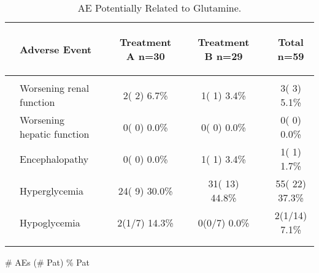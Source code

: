 \documentclass[dvips,10pt]{article}
\begin{document}
\begin{table}[t]
\caption
{ AE Potentially Related to Glutamine. }
\begin{center}
\begin{tabular}{ @{}l@{}
@{}l@{}@{}p{1.5em}@{}@{}c@{}@{}p{1.5em}@{}@{}c@{}@{}p{1.5em}@{}@{}c@{}
}
\hline

& \parbox{6em}{\begin{center}Adverse Event\end{center}} && \parbox{6em}{\begin{center}Treatment A n=30\end{center}} && \parbox{6em}{\begin{center}Treatment B n=29\end{center}} && \parbox{6em}{\begin{center}Total n=59\end{center}} \\

\hline

\\
& Worsening renal function && 2(  2)  6.7\% && 1(  1)  3.4\% && 3(  3)  5.1\% \\
& Worsening hepatic function && 0(  0)  0.0\% && 0(  0)  0.0\% && 0(  0)  0.0\% \\
& Encephalopathy && 0(  0)  0.0\% && 1(  1)  3.4\% && 1(  1)  1.7\% \\
& Hyperglycemia && 24(  9) 30.0\% && 31( 13) 44.8\% && 55( 22) 37.3\% \\
& Hypoglycemia && 2(1/7)  14.3\% && 0(0/7)  0.0\% && 2(1/14)  7.1\% \\
\\
\hline \\

\end{tabular}


\parbox{ 5in }{ \# AEs (\# Pat) \% Pat } \\
 \vspace{1em}\end{center}
 \end{table}
\clearpage
\end{document}
